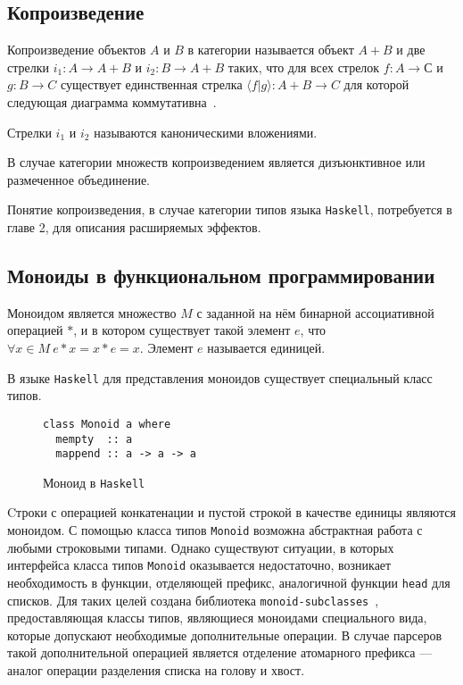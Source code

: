 \subsection{Копроизведение}

Копроизведение объектов $A$ и $B$ в категории называется объект $A + B$ и две
стрелки $i_1 : A \to A + B$ и $i_2 : B \to A + B$ таких, что для всех стрелок
$f : A \to С$ и $g : B \to C$ существует единственная стрелка 
$\langle f|g\rangle  : A + B \to C$ для которой следующая диаграмма 
коммутативна~\cite{TeorCat}.

\begin{center}
\end{center}

Стрелки $i_1$ и $i_2$ называются каноническими вложениями.

В случае категории множеств копроизведением является дизъюнктивное 
или размеченное объединение.  

Понятие копроизведения, в случае категории типов языка \lstinline{Haskell}, 
потребуется в главе 2, для описания расширяемых эффектов.

\subsection{Моноиды в функциональном программировании}

Моноидом является множество $M$ с заданной на нём бинарной ассоциативной 
операцией $*$, и в котором существует такой элемент 
$e$, что $\forall x \in M~e*x = x*e = x$. Элемент $e$ называется единицей.

В языке \lstinline{Haskell} для представления моноидов существует специальный 
класс типов.

\begin{figure}[h]
\begin{lstlisting}
class Monoid a where
  mempty  :: a
  mappend :: a -> a -> a
\end{lstlisting}
\caption{Моноид в \lstinline{Haskell}}
\label{listing:Monoid}
\end{figure}

Cтроки с операцией конкатенации и пустой строкой в качестве единицы являются 
моноидом. С помощью класса типов \lstinline{Monoid} возможна абстрактная работа 
с любыми строковыми типами. Однако существуют ситуации, в которых интерфейса 
класса типов \lstinline{Monoid} оказывается недостаточно, возникает 
необходимость в функции, отделяющей префикс, аналогичной функции 
\lstinline{head} для списков. Для таких целей создана библиотека 
\lstinline{monoid-subclasses}~\cite{monoids}, предоставляющая 
классы типов, являющиеся моноидами специального вида, которые допускают 
необходимые дополнительные операции. В случае парсеров такой дополнительной 
операцией является отделение атомарного префикса --- аналог операции разделения 
списка на голову и хвост.

